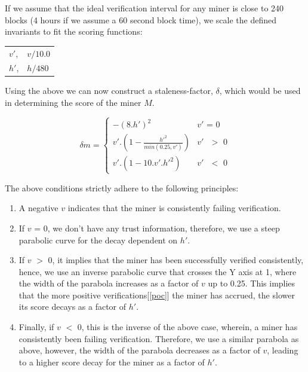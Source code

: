 \documentclass[UTF8, 10pt, nonatbib, nocopyrightspace, reprint]{sigplanconf}
\newcommand{\secref}[1]{[\autoref{#1}]}
\begin{document}
If we assume that the ideal verification interval for any miner is close to 240 blocks (4 hours if we assume a 60 second block time), we scale the defined invariants to fit the scoring functions:

\begin{tabular}{l l}
        $v'$, &$v/10.0$\\
        $h'$, &$h/480$ \\
\end{tabular}

Using the above we can now construct a staleness-factor, $\delta$, which would be used in determining the score of the miner $M$.

\begin{equation*} \label{score}
        \delta{m} = \begin{cases}
        	-(8.h')^{2}&\text{$v'$ = 0}\\
        	v'.(1 - \frac{h'^{2}}{min(0.25, v')})&\text{$v'$ $>$ 0}\\
        	v'.(1 - 10.v'.h'^{2})&\text{$v'$ $<$ 0}
        \end{cases}
\end{equation*}

The above conditions strictly adhere to the following principles:

\begin{enumerate}
  \item A negative $v$ indicates that the miner is consistently failing verification.
  
  \item If $v$ = 0, we don't have any trust information, therefore, we use a steep parabolic curve for the decay dependent on $h'$.
  
  \item If $v$ $>$ 0, it implies that the miner has been successfully verified consistently, hence, we use an inverse parabolic curve that crosses the Y axis at 1, where the width of the parabola increases as a factor of $v$ up to 0.25. This implies that the more positive verifications\secref{poc} the miner has accrued, the slower its score decays as a factor of $h'$.
   
  \item Finally, if $v$ $<$ 0, this is the inverse of the above case, wherein, a miner has consistently been failing verification. Therefore, we use a similar parabola as above, however, the width of the parabola decreases as a factor of $v$, leading to a higher score decay for the miner as a factor of $h'$.
  
\end{enumerate}
\end{document}
